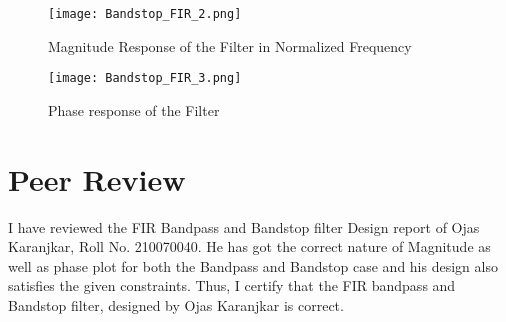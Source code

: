 \documentclass[12pt]{article}
\begin{document}
\begin{figure}[H]
    \centering
    \texttt{[image: Bandstop\_FIR\_2.png]}
    \caption{Magnitude Response of the Filter in Normalized Frequency}
\end{figure}

\begin{figure}[H]
    \centering
    \texttt{[image: Bandstop\_FIR\_3.png]}
    \caption{Phase response of the Filter}
\end{figure}

\section{Peer Review}
I have reviewed the FIR Bandpass and Bandstop filter Design report of Ojas Karanjkar, Roll No. 210070040. He has got the correct nature of Magnitude as well as phase plot for both the Bandpass and Bandstop case and his design also satisfies the given constraints. Thus, I certify that the FIR bandpass and Bandstop filter, designed by Ojas Karanjkar is correct.
\end{document}
